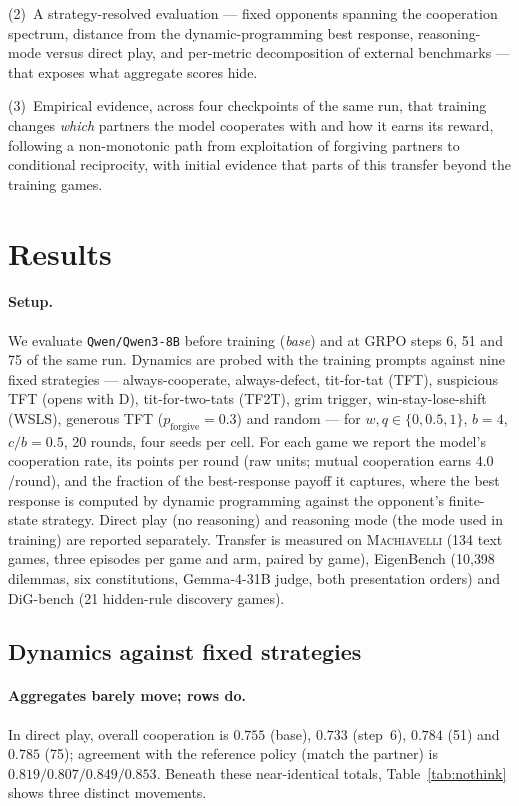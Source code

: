 \documentclass{article}
\newcommand{\machiavelli}{\textsc{Machiavelli}}
\begin{document}
(2)~A strategy-resolved evaluation --- fixed opponents spanning the
cooperation spectrum, distance from the dynamic-programming best response,
reasoning-mode versus direct play, and per-metric decomposition of external
benchmarks --- that exposes what aggregate scores hide.

(3)~Empirical evidence, across four checkpoints of the same run, that training
changes \emph{which} partners the model cooperates with and how it earns its
reward, following a non-monotonic path from exploitation of forgiving partners
to conditional reciprocity, with initial evidence that parts of this transfer
beyond the training games.

\section{Results}
\label{sec:results}

\paragraph{Setup.}
We evaluate \texttt{Qwen/Qwen3-8B} before training (\emph{base}) and at GRPO
steps 6, 51 and 75 of the same run. Dynamics are probed with the training
prompts against nine fixed strategies --- always-cooperate, always-defect,
tit-for-tat (TFT), suspicious TFT (opens with D), tit-for-two-tats (TF2T),
grim trigger, win-stay-lose-shift (WSLS), generous TFT ($p_{\text{forgive}}=0.3$)
and random --- for $w,q\in\{0,0.5,1\}$, $b=4$, $c/b=0.5$, 20 rounds, four seeds
per cell. For each game we report the model's cooperation rate, its points per
round (raw units; mutual cooperation earns $4.0$/round), and the fraction of
the best-response payoff it captures, where the best response is computed by
dynamic programming against the opponent's finite-state strategy. Direct play
(no reasoning) and reasoning mode (the mode used in training) are reported
separately. Transfer is measured on \machiavelli{} (134 text games, three
episodes per game and arm, paired by game), EigenBench (10{,}398 dilemmas,
six constitutions, Gemma-4-31B judge, both presentation orders) and DiG-bench
(21 hidden-rule discovery games).

\subsection{Dynamics against fixed strategies}

\paragraph{Aggregates barely move; rows do.}
In direct play, overall cooperation is $0.755$ (base), $0.733$ (step~6),
$0.784$ (51) and $0.785$ (75); agreement with the reference policy (match the
partner) is $0.819/0.807/0.849/0.853$. Beneath these near-identical totals,
Table~\ref{tab:nothink} shows three distinct movements.
\end{document}

